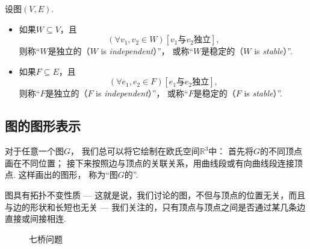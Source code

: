 \begin{definition}
设图\((V,E)\).
\begin{itemize}
	\item 如果\(W \subseteq V\)，且\begin{equation*}
		(\forall v_1,v_2 \in W)
		\left[\text{$v_1$与$v_2$独立}\right],
	\end{equation*}
	则称“\(W\)是独立的（\(W\) is \emph{independent}）”，
	或称“\(W\)是稳定的（\(W\) is \emph{stable}）”.

	\item 如果\(F \subseteq E\)，且\begin{equation*}
		(\forall e_1,e_2 \in F)
		\left[\text{$e_1$与$e_2$独立}\right],
	\end{equation*}
	则称“\(F\)是独立的（\(F\) is \emph{independent}）”，
	或称“\(F\)是稳定的（\(F\) is \emph{stable}）”.
\end{itemize}
\end{definition}

\subsection{图的图形表示}
对于任意一个图\(G\)，
我们总可以将它绘制在欧氏空间\(\mathbb{R}^3\)中：
首先将\(G\)的不同顶点画在不同位置；
接下来按照边与顶点的关联关系，用曲线段或有向曲线段连接顶点.
这样画出的图形，
称为“图\(G\)的”.
\begin{remark}
图具有拓扑不变性质 ---
这就是说，我们讨论的图，不但与顶点的位置无关，而且与边的形状和长短也无关
--- 我们关注的，只有顶点与顶点之间是否通过某几条边直接或间接相连.
\end{remark}

\begin{figure}[hbt]
	\centering
	\caption{七桥问题}
	\label{figure:图论.七桥问题}
\end{figure}

